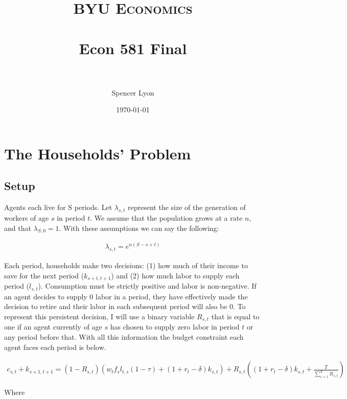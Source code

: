 \documentclass[paper=a4, fontsize=11pt]{scrartcl} %
\title{
	\normalfont \normalsize
	\textsc{BYU Economics} \\ [25pt] %
	\horrule{0.5pt} \\[0.4cm] %
	\huge Econ 581 Final \\ %
	\horrule{2pt} \\[0.5cm] %
	}
\author{Spencer Lyon} %
\date{\normalsize\today} %
\numberwithin{figure}{section} %
\numberwithin{table}{section} %
\begin{document}
\maketitle %
\thispagestyle{empty}
\pagestyle{fancyplain}


\section{The Households' Problem}

	\subsection{Setup}

		Agents each live for S periods. Let $\lambda_{s, t}$ represent the size of the generation of workers of age $s$ in period $t$. We assume that the population grows at a rate $n$, and that $\lambda_{S, 0} = 1$. With these assumptions we can say the following:

		\begin{align}
			\lambda_{s, t} = e^{n(S-s+t)}
		\end{align}


            Each period, households make two decisions: (1) how much of their income to save for the next period ($k_{s+t, t+1}$) and (2) how much labor to supply each period ($l_{s,t}$). Consumption must be strictly positive and labor is non-negative. If an agent decides to supply 0 labor in a period, they have effectively made the decision to retire and their labor in each subsequent period will also be 0. To represent this persistent decision, I will use a binary variable $R_{s, t}$ that is equal to one if an agent currently of age $s$ has chosen to supply zero labor in period $t$ or any period before that. With all this information the budget constraint each agent faces each period is below.

            \begin{align} \label{eq:budget}
              c_{s, t} + k_{s+1, t+1} = (1 - R_{s,t}) \left(w_t f_s l_{t, s} (1 - \tau) + (1 + r_t - \delta) k_{s, t}\right) + R_{s, t} \left((1 + r_t - \delta) k_{s, t} + \frac{T}{\sum_{s=1}^S R_{s, t}}\right)
            \end{align}

            Where
\end{document}
